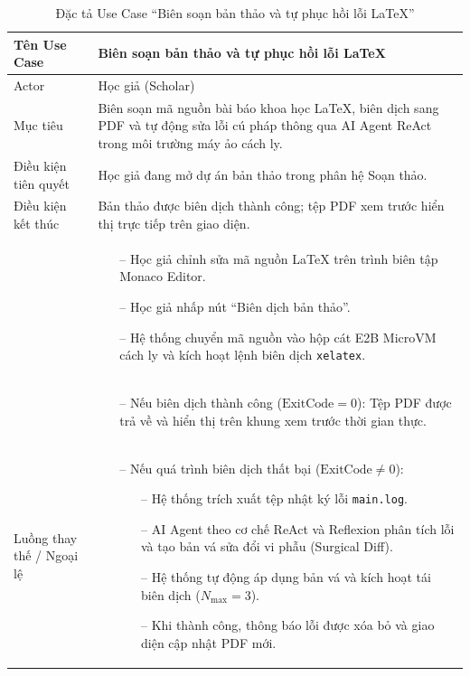 \begingroup
\setlength{\tabcolsep}{6pt}
\renewcommand{\arraystretch}{1.20}
\begin{xltabular}{\textwidth}{|>{\raggedright\arraybackslash}m{3.2cm}|>{\raggedright\arraybackslash}X|}
\caption{Đặc tả Use Case ``Biên soạn bản thảo và tự phục hồi lỗi LaTeX''} \label{tab:uc_bien_soan_spec} \\
\hline
\endfirsthead

\hline
\endhead

\hline
\endfoot

\hline
\endlastfoot

Tên Use Case & Biên soạn bản thảo và tự phục hồi lỗi LaTeX \tabularnewline \hline
Actor & Học giả (Scholar) \tabularnewline \hline
Mục tiêu & Biên soạn mã nguồn bài báo khoa học LaTeX, biên dịch sang PDF và tự động sửa lỗi cú pháp thông qua AI Agent ReAct trong môi trường máy ảo cách ly. \tabularnewline \hline
Điều kiện tiên quyết & Học giả đang mở dự án bản thảo trong phân hệ Soạn thảo. \tabularnewline \hline
Điều kiện kết thúc & Bản thảo được biên dịch thành công; tệp PDF xem trước hiển thị trực tiếp trên giao diện. \tabularnewline \hline
{} & 
\begin{itemize}[leftmargin=*, noitemsep, topsep=0pt]
    \item[--] Học giả chỉnh sửa mã nguồn LaTeX trên trình biên tập Monaco Editor.
    \item[--] Học giả nhấp nút ``Biên dịch bản thảo''.
    \item[--] Hệ thống chuyển mã nguồn vào hộp cát E2B MicroVM cách ly và kích hoạt lệnh biên dịch \texttt{xelatex}.
\end{itemize} \tabularnewline {}
& 
\begin{itemize}[leftmargin=*, noitemsep, topsep=0pt]
    \item[--] Nếu biên dịch thành công ($\text{ExitCode} = 0$): Tệp PDF được trả về và hiển thị trên khung xem trước thời gian thực.
\end{itemize} \tabularnewline \hline
Luồng thay thế / Ngoại lệ & 
\begin{itemize}[leftmargin=*, noitemsep, topsep=0pt]
    \item[--] Nếu quá trình biên dịch thất bại ($\text{ExitCode} \ne 0$):
    \begin{itemize}[leftmargin=*, noitemsep, topsep=0pt]
        \item[--] Hệ thống trích xuất tệp nhật ký lỗi \texttt{main.log}.
        \item[--] AI Agent theo cơ chế ReAct và Reflexion phân tích lỗi và tạo bản vá sửa đổi vi phẫu (Surgical Diff).
        \item[--] Hệ thống tự động áp dụng bản vá và kích hoạt tái biên dịch ($N_{\max} = 3$).
        \item[--] Khi thành công, thông báo lỗi được xóa bỏ và giao diện cập nhật PDF mới.
    \end{itemize}
\end{itemize} \tabularnewline
\end{xltabular}
\endgroup
\FloatBarrier

